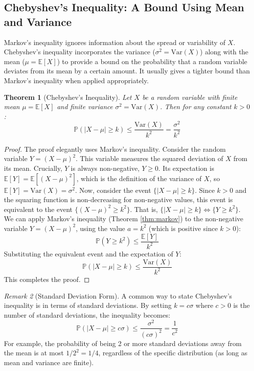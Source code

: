 \documentclass[11pt, letterpaper]{article}
\theoremstyle{plain} %
\newtheorem{theorem}{Theorem}[section]
\theoremstyle{definition} %
\theoremstyle{remark} %
\newtheorem{remark}[theorem]{Remark}
\newcommand{\E}{\mathbb{E}} %
\newcommand{\Var}{\text{Var}} %
\newcommand{\Prob}{\mathbb{P}} %
\begin{document}
\subsection{Chebyshev's Inequality: A Bound Using Mean and Variance}

Markov's inequality ignores information about the spread or variability of $X$. Chebyshev's inequality incorporates the variance ($\sigma^2 = \Var(X)$) along with the mean ($\mu = \E[X]$) to provide a bound on the probability that a random variable deviates from its mean by a certain amount. It usually gives a tighter bound than Markov's inequality when applied appropriately.

\begin{theorem}[Chebyshev's Inequality] \label{thm:chebyshev}
Let $X$ be a random variable with finite mean $\mu = \E[X]$ and finite variance $\sigma^2 = \Var(X)$. Then for any constant $k > 0$:
\[
\Prob(|X - \mu| \ge k) \le \frac{\Var(X)}{k^2} = \frac{\sigma^2}{k^2}
\]
\end{theorem}

\begin{proof}
The proof elegantly uses Markov's inequality. Consider the random variable $Y = (X - \mu)^2$.
This variable measures the squared deviation of $X$ from its mean. Crucially, $Y$ is always non-negative, $Y \ge 0$.
Its expectation is $\E[Y] = \E[(X - \mu)^2]$, which is the definition of the variance of $X$, so $\E[Y] = \Var(X) = \sigma^2$.
Now, consider the event $\{|X - \mu| \ge k\}$. Since $k > 0$ and the squaring function is non-decreasing for non-negative values, this event is equivalent to the event $\{(X - \mu)^2 \ge k^2\}$. That is, $\{|X - \mu| \ge k\} \iff \{Y \ge k^2\}$.
We can apply Markov's inequality (Theorem \ref{thm:markov}) to the non-negative variable $Y = (X-\mu)^2$, using the value $a = k^2$ (which is positive since $k>0$):
\[
\Prob(Y \ge k^2) \le \frac{\E[Y]}{k^2}
\]
Substituting the equivalent event and the expectation of $Y$:
\[
\Prob(|X - \mu| \ge k) \le \frac{\Var(X)}{k^2}
\]
This completes the proof.
\end{proof}

\begin{remark}[Standard Deviation Form]
A common way to state Chebyshev's inequality is in terms of standard deviations. By setting $k = c \sigma$ where $c > 0$ is the number of standard deviations, the inequality becomes:
\[
\Prob(|X - \mu| \ge c \sigma) \le \frac{\sigma^2}{(c \sigma)^2} = \frac{1}{c^2}
\]
For example, the probability of being 2 or more standard deviations away from the mean is at most $1/2^2 = 1/4$, regardless of the specific distribution (as long as mean and variance are finite).
\end{remark}
\end{document}
